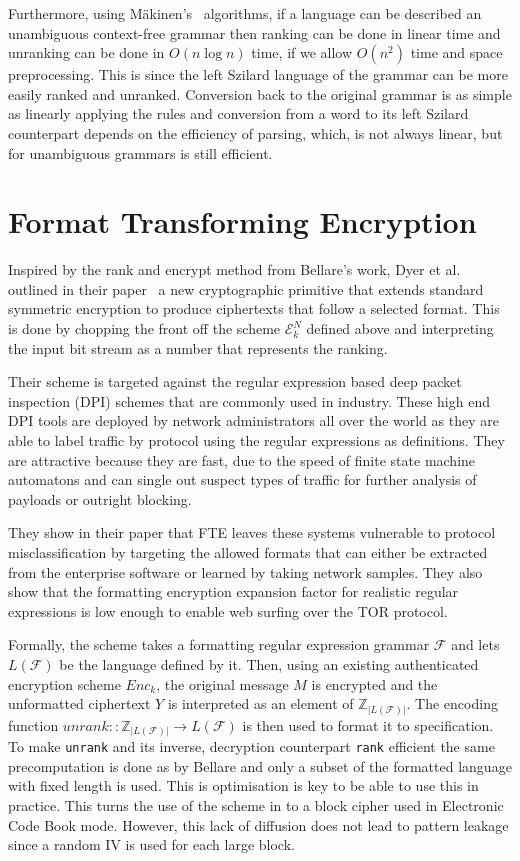 \documentclass[ %
                    author={Samuel Russell},
                supervisor={Prof. Bogdan Warinschi},
                    degree={MEng},
                     title={Innocuous Ciphertexts},
                  subtitle={The DE-CENSOR Scheme},
                      type={research},
                      year={2018} ]{dissertation}
\begin{document}
Furthermore, using M\"akinen's~\cite{rankcf} algorithms, if a language can be described an unambiguous context-free grammar then ranking can be done in linear time and unranking can be done in $O(n \log n)$ time, if we allow $O(n^2)$ time and space preprocessing. This is since the left Szilard language of the grammar can be more easily ranked and unranked. Conversion back to the original grammar is as simple as linearly applying the rules and conversion from a word to its left Szilard counterpart depends on the efficiency of parsing, which, is not always linear, but for unambiguous grammars is still efficient.

\section{Format Transforming Encryption}\label{sec:FTE}

Inspired by the rank and encrypt method from Bellare's work, Dyer et al. outlined in their paper~\cite{fte} a new cryptographic primitive that extends standard symmetric encryption to produce ciphertexts that follow a selected format. This is done by chopping the front off the scheme $\mathcal{E}^N_k$ defined above and interpreting the input bit stream as a number that represents the ranking.

Their scheme is targeted against the regular expression based deep packet inspection (DPI) schemes that are commonly used in industry. These high end DPI tools are deployed by network administrators all over the world as they are able to label traffic by protocol using the regular expressions as definitions. They are attractive because they are fast, due to the speed of finite state machine automatons and can single out suspect types of traffic for further analysis of payloads or outright blocking.

They show in their paper that FTE leaves these systems vulnerable to protocol misclassification by targeting the allowed formats that can either be extracted from the enterprise software or learned by taking network samples. They also show that the formatting encryption expansion factor for realistic regular expressions is low enough to enable web surfing over the TOR protocol.

Formally, the scheme takes a formatting regular expression grammar $\mathcal{F}$ and lets $L(\mathcal{F})$ be the language defined by it. Then, using an existing authenticated encryption scheme $Enc_k$, the original message $M$ is encrypted and the unformatted ciphertext $Y$ is interpreted as an element of $\mathbb{Z}_{\vert L(\mathcal{F}) \vert}$. The encoding function $unrank :: \mathbb{Z}_{\vert L(\mathcal{F}) \vert} \rightarrow L(\mathcal{F})$ is then used to format it to specification. To make \texttt{unrank} and its inverse, decryption counterpart \texttt{rank} efficient the same precomputation is done as by Bellare and only a subset of the formatted language with fixed length is used. This is optimisation is key to be able to use this in practice. This turns the use of the scheme in to a block cipher used in Electronic Code Book mode. However, this lack of diffusion does not lead to pattern leakage since a random IV is used for each large block.
\end{document}
